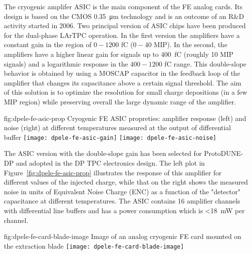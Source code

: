 The cryogenic amplifer ASIC is the main component of the FE analog cards. Its design is based on the CMOS \SI{0.35}{\micro\meter} technology and is an outcome of an R\&D  activity started in 2006. Two principal version of ASIC chips have been produced for the dual-phase LArTPC operation. In the first version the amplifiers have a constant gain in the region of $0-1200$ \si{\femto\coulomb} ($0-40$ MIP). In the second, the amplifiers have a higher linear gain for signals up to \SI{400}{\femto\coulomb} (roughly 10 MIP signals) and a logarithmic response in the  $400-1200$ \si{\femto\coulomb} range. This double-slope behavior is obtained by using a MOSCAP capacitor in the feedback loop of the amplifier that changes its capacitance above a certain signal threshold. The aim of this solution is to optimize the resolution for small charge depositions (in a few MIP region) while preserving overall the large dynamic range of the amplifier.


\begin{dunefigure}{fig:dpele-fe-asic-prop}
{Cryogenic FE ASIC propreties: amplifier response (left) and noise (right) at different temperatures measured at the output of differential buffer}
\texttt{[image: dpele-fe-asic-gain]}
\texttt{[image: dpele-fe-asic-noise]}
\end{dunefigure}

The ASIC version with the double-slope gain has been selected for ProtoDUNE-DP and adopted in the DP TPC electronics design. The left plot in Figure~\ref{fig:dpele-fe-asic-prop} illustrates the response of this amplifier for different values of the injected charge, while that on the right shows the measured noise in units of Equivalent Noise Charge (ENC) as a function of the "detector" capacitance at different temperatures. The ASIC contains \num{16} amplifier channels with differential line buffers and has a power consumption which is \SI{<18}{\milli\watt} per channel. 

\begin{dunefigure}{fig:dpele-fe-card-blade-image}
{Image of an analog cryogenic FE card mounted on the extraction blade}
\texttt{[image: dpele-fe-card-blade-image]}
\end{dunefigure}

